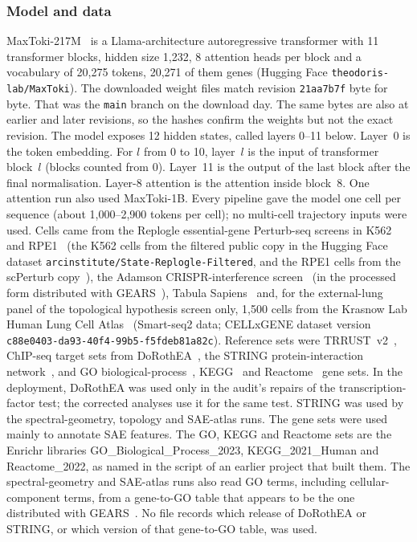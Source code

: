 \subsubsection*{Model and data}
MaxToki-217M~\cite{maxtoki2026} is a Llama-architecture autoregressive
transformer with 11 transformer blocks, hidden size 1,232, 8 attention
heads per block and a vocabulary of 20,275 tokens, 20,271 of them genes (Hugging Face
\texttt{theodoris-lab/MaxToki}). The downloaded weight files match
revision \texttt{21aa7b7f} byte for byte. That was the \texttt{main}
branch on the download day. The same bytes are also at earlier and later
revisions, so the hashes confirm the weights but not the exact revision.
The model exposes 12 hidden states, called layers 0--11 below. Layer~0
is the token embedding. For $l$ from 0 to 10, layer~$l$ is the input of
transformer block~$l$ (blocks counted from 0). Layer~11 is the output of
the last block after the final normalisation. Layer-8 attention is the
attention inside block~8. One attention run also used MaxToki-1B. Every pipeline gave
the model one cell per sequence (about 1,000--2,900 tokens per cell); no
multi-cell trajectory inputs were used. Cells came from the Replogle
essential-gene Perturb-seq screens in K562 and
RPE1~\cite{replogle2022perturbseq} (the K562 cells from the filtered public
copy in the Hugging Face dataset \texttt{arcinstitute/State-Replogle-Filtered},
and the RPE1 cells from the scPerturb copy~\cite{peidli2024scperturb}),
the Adamson CRISPR-interference
screen~\cite{adamson2016perturbseq} (in the processed form distributed with
GEARS~\cite{roohani2024gears}), Tabula
Sapiens~\cite{tabulasapiens2022} and, for the external-lung panel of the
topological hypothesis screen only, 1,500 cells from the Krasnow Lab Human
Lung Cell Atlas~\cite{travaglini2020lung} (Smart-seq2 data; CELLxGENE dataset
version \texttt{c88e0403-da93-40f4-99b5-f5fdeb81a82c}). Reference sets were
TRRUST~v2~\cite{han2018trrust}, ChIP-seq target sets from
DoRothEA~\cite{garcia-alonso2019dorothea}, the STRING protein-interaction
network~\cite{szklarczyk2023string}, and GO
biological-process~\cite{ashburner2000go}, KEGG~\cite{kanehisa2000kegg}
and Reactome~\cite{gillespie2022reactome} gene sets. In the
deployment, DoRothEA was used only in the audit's repairs of the
transcription-factor test; the corrected analyses use it for the same
test. STRING was used by the spectral-geometry, topology and SAE-atlas
runs. The gene sets were used mainly to annotate SAE features. The GO,
KEGG and Reactome sets are the Enrichr libraries
GO\_Biological\_Process\_2023, KEGG\_2021\_Human and Reactome\_2022, as
named in the script of an earlier project that built them. The
spectral-geometry and SAE-atlas runs also read GO terms, including
cellular-component terms, from a gene-to-GO table that appears to be the
one distributed with GEARS~\cite{roohani2024gears}. No file records which
release of DoRothEA or STRING, or which version of that gene-to-GO table,
was used.

